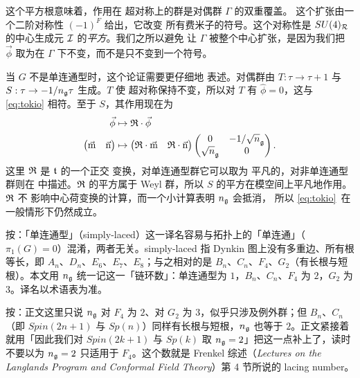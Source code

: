 这个平方根意味着，作用在
超对称上的群是对偶群 $\Gamma$ 的双重覆盖。
这个扩张由一个二阶对称性 $(-1)^F$ 给出，它改变
所有费米子的符号。这个对称性是 $SU(4)_{\cal R}$ 的中心生成元 ${\EUI} $ 的{\it 平方}。我们之所以避免
让 $\Gamma$ 被整个中心扩张，是因为我们把
$\vec{\phi}$ 取为在 $\Gamma$ 下不变，而不是只不变到一个符号。

当 $G$ 不是单连通型时，这个论证需要更仔细地
表述。对偶群由 $T:\tau\to
\tau+1$ 与 $S:\tau\to -1/n_{\frak g}\tau$ 生成。$T$ 使
超对称保持不变，所以对 $T$ 有 $\hat\phi=0$，这与 \eqref{eq:tokio}
相符。至于 $S$，其作用现在为 %
\setcounter{equation}{25}
\begin{equation}\label{eq:xiljo}
\begin{aligned}\vec{\phi} &
\mapsto {\frak R}\cdot\vec{\phi}\\\left(\begin{matrix}\vec{{\eurm m}} &
\vec{{\eurm n}}\end{matrix}\right)&\mapsto \left(\begin{matrix}{\frak R}\cdot
\vec{{\eurm m}} & {\frak R}\cdot\vec{{\eurm
n}}\end{matrix}\right)\left(\begin{matrix}0 & -1/\sqrt n_{\frak g} \\ \sqrt
n_{\frak g} & 0 \\\end{matrix}\right).\end{aligned}
\end{equation}
这里 $\frak R$ 是 $\frak t$ 的一个正交
变换，对单连通型群它可以取为
平凡的，对非单连通型群则在 \cite{ref47} 中描述。$\frak R$ 的平方属于 Weyl 群，所以 $S$
的平方在模空间上平凡地作用。$\frak R$ 不
影响中心荷变换的计算，而一个小计算表明 $n_{\frak g}$ 会抵消，
所以 \eqref{eq:tokio}\ 在一般情形下仍然成立。
\begin{yizhu}[易错点]
按：「单连通型」（simply-laced）这一译名容易与拓扑上的「单连通」（$\pi_1(G)=0$）混淆，两者无关。simply-laced 指 Dynkin 图上没有多重边、所有根等长，即 $A_n$、$D_n$、$E_6$、$E_7$、$E_8$；与之相对的是 $B_n$、$C_n$、$F_4$、$G_2$（有长根与短根）。本文用 $n_{\frak g}$ 统一记这一「链环数」：单连通型为 $1$，$B_n$、$C_n$、$F_4$ 为 $2$，$G_2$ 为 $3$。译名以术语表为准。
\end{yizhu}

\begin{yizhu}[含糊点拨]
按：正文这里只说 $n_{\frak g}$ 对 $F_4$ 为 $2$、对 $G_2$ 为 $3$，似乎只涉及例外群；但 $B_n$、$C_n$（即 $Spin(2n+1)$ 与 $Sp(n)$）同样有长根与短根，$n_{\frak g}$ 也等于 $2$。正文紧接着就用「因此我们对 $Spin(2k+1)$ 与 $Sp(k)$ 取 $n_{\frak g}=2$」把这一点补上了，读时不要以为 $n_{\frak g}=2$ 只适用于 $F_4$。这个数就是 Frenkel 综述（\emph{Lectures on the Langlands Program and Conformal Field Theory}）第 4 节所说的 lacing number。
\end{yizhu}

